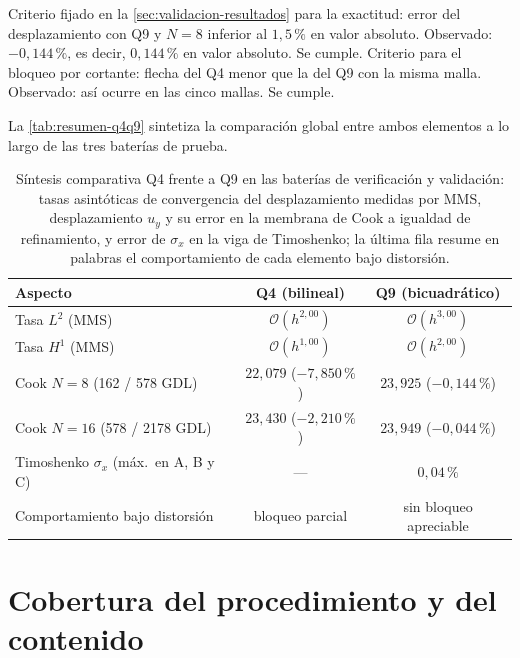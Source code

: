 Criterio fijado en la \autoref{sec:validacion-resultados} para la exactitud: error del desplazamiento con Q9 y $N=8$ inferior al $1{,}5\,\%$ en valor absoluto. Observado: $-0{,}144\,\%$, es decir, $0{,}144\,\%$ en valor absoluto. Se cumple. Criterio para el bloqueo por cortante: flecha del Q4 menor que la del Q9 con la misma malla. Observado: así ocurre en las cinco mallas. Se cumple.

La \autoref{tab:resumen-q4q9} sintetiza la comparación global entre ambos elementos a lo largo de las tres baterías de prueba.

\begin{table}[htbp]
\centering
\caption[Síntesis comparativa Q4 frente a Q9 en las baterías de verificación y validación.]{Síntesis comparativa Q4 frente a Q9 en las baterías de verificación y validación: tasas asintóticas de convergencia del desplazamiento medidas por MMS, desplazamiento $u_y$ y su error en la membrana de Cook a igualdad de refinamiento, y error de $\sigma_x$ en la viga de Timoshenko; la última fila resume en palabras el comportamiento de cada elemento bajo distorsión.}
\label{tab:resumen-q4q9}
\begin{tabular}{l c c}
\hline
Aspecto & Q4 (bilineal) & Q9 (bicuadrático) \\
\hline
Tasa $L^2$ (MMS)              & $\mathcal{O}(h^{2{,}00})$ & $\mathcal{O}(h^{3{,}00})$ \\
Tasa $H^1$ (MMS)              & $\mathcal{O}(h^{1{,}00})$ & $\mathcal{O}(h^{2{,}00})$ \\
Cook $N=8$ (162 / 578 GDL)    & $22{,}079$ ($-7{,}850\,\%$) & $23{,}925$ ($-0{,}144\,\%$) \\
Cook $N=16$ (578 / 2178 GDL)  & $23{,}430$ ($-2{,}210\,\%$) & $23{,}949$ ($-0{,}044\,\%$) \\
Timoshenko $\sigma_x$ (máx.\ en A, B y C) & --- & $0{,}04\,\%$ \\
Comportamiento bajo distorsión & bloqueo parcial & sin bloqueo apreciable \\
\hline
\end{tabular}
{\singlespacing{}}
\end{table}

\section{Cobertura del procedimiento y del contenido}
\label{sec:cobertura}

